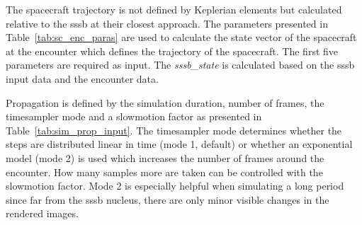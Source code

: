 The spacecraft trajectory is not defined by Keplerian elements but calculated relative to the \gls{sssb} at their closest approach. The parameters presented in Table~\ref{tab:sc_enc_paras} are used to calculate the state vector of the spacecraft at the encounter which defines the trajectory of the spacecraft. The first five parameters are required as input. The \textit{sssb\_state} is calculated based on the \gls{sssb} input data and the encounter data.

\begin{table}[htb]
    \centering
    \caption{Parameters that define the encounter state of the spacecraft. The first five parameters are required as input.}
    \label{tab:sc_enc_paras}
\end{table}

Propagation is defined by the simulation duration, number of frames, the timesampler mode and a slowmotion factor as presented in Table~\ref{tab:sim_prop_input}. The timesampler mode determines whether the steps are distributed linear in time (mode 1, default) or whether an exponential model (mode 2) is used which increases the number of frames around the encounter. How many samples more are taken can be controlled with the slowmotion factor. Mode 2 is especially helpful when simulating a long period since far from the \gls{sssb} nucleus, there are only minor visible changes in the rendered images.

